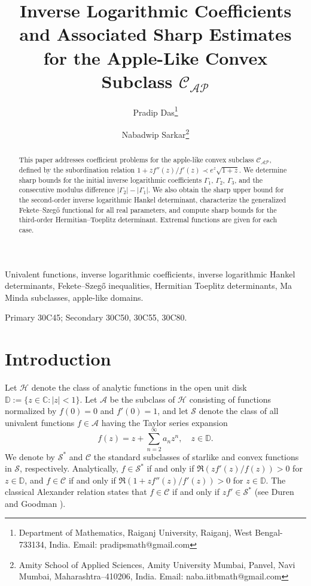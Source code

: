 \documentclass[11pt]{article}
\numberwithin{equation}{section}
\begin{document}
\title{Inverse Logarithmic Coefficients and Associated Sharp Estimates for the Apple-Like Convex Subclass $\mathcal{C}_{\mathcal{AP}}$}

\author{Pradip Das\thanks{Department of Mathematics, Raiganj University, Raiganj, West Bengal-733134, India. Email: pradipsmath@gmail.com} 
\and 
Nabadwip Sarkar\thanks{Amity School of Applied Sciences, Amity University Mumbai, Panvel, Navi Mumbai, Maharashtra--410206, India. Email: naba.iitbmath@gmail.com}}

\date{}

\maketitle

\vspace{1mm}

\begin{abstract}
This paper addresses coefficient problems for the apple-like convex subclass $\mathcal{C}_{\mathcal{AP}}$, defined by the subordination relation $1+zf''(z)/f'(z) \prec e^z\sqrt{1+z}$. We determine sharp bounds for the initial inverse logarithmic coefficients $\Gamma_1$, $\Gamma_2$, $\Gamma_3$, and the consecutive modulus difference $|\Gamma_2|-|\Gamma_1|$. We also obtain the sharp upper bound for the second-order inverse logarithmic Hankel determinant, characterize the generalized Fekete--Szeg\H{o} functional for all real parameters, and compute sharp bounds for the third-order Hermitian--Toeplitz determinant. Extremal functions are given for each case.
\end{abstract}

 Univalent functions, inverse logarithmic coefficients, inverse logarithmic Hankel determinants, Fekete--Szeg\H{o} inequalities, Hermitian Toeplitz determinants, Ma Minda subclasses, apple-like domains.

 Primary 30C45; Secondary 30C50, 30C55, 30C80.

\section{Introduction}
Let $\mathcal{H}$ denote the class of analytic functions in the open unit disk $\mathbb{D}:=\{z\in\mathbb{C}:|z|<1\}$. Let $\mathcal{A}$ be the subclass of $\mathcal{H}$ consisting of functions normalized by $f(0)=0$ and $f'(0)=1$, and let $\mathcal{S}$ denote the class of all univalent functions $f\in\mathcal{A}$ having the Taylor series expansion
\begin{equation}\label{eq1}
f(z)=z+\sum_{n=2}^{\infty}a_nz^n, \quad z\in\mathbb{D}.
\end{equation}
We denote by $\mathcal{S}^{\ast}$ and $\mathcal{C}$ the standard subclasses of starlike and convex functions in $\mathcal{S}$, respectively. Analytically, $f \in \mathcal{S}^{\ast}$ if and only if $\Re(zf'(z)/f(z))>0$ for $z\in\mathbb{D}$, and $f \in \mathcal{C}$ if and only if $\Re(1+zf''(z)/f'(z))>0$ for $z\in\mathbb{D}$. The classical Alexander relation states that $f\in\mathcal{C}$ if and only if $zf'\in\mathcal{S}^{\ast}$ (see Duren \cite{PLD1} and Goodman \cite{G}).
\end{document}
